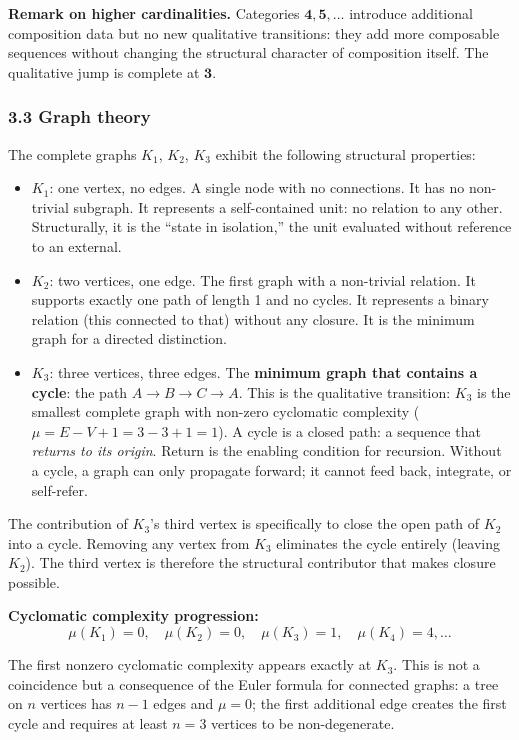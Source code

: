 \documentclass[
  11pt,
  letterpaper,
]{article}
\begin{document}
\textbf{Remark on higher cardinalities.} Categories
\(\mathbf{4}, \mathbf{5}, \ldots\) introduce additional composition data
but no new qualitative transitions: they add more composable sequences
without changing the structural character of composition itself. The
qualitative jump is complete at \(\mathbf{3}\).

\subsubsection{3.3 Graph theory}\label{graph-theory}

The complete graphs \(K_1\), \(K_2\), \(K_3\) exhibit the following
structural properties:

\begin{itemize}
\item
  \(K_1\): one vertex, no edges. A single node with no connections. It
  has no non-trivial subgraph. It represents a self-contained unit: no
  relation to any other. Structurally, it is the ``state in isolation,''
  the unit evaluated without reference to an external.
\item
  \(K_2\): two vertices, one edge. The first graph with a non-trivial
  relation. It supports exactly one path of length 1 and no cycles. It
  represents a binary relation (this connected to that) without any
  closure. It is the minimum graph for a directed distinction.
\item
  \(K_3\): three vertices, three edges. The \textbf{minimum graph that
  contains a cycle}: the path \(A \to B \to C \to A\). This is the
  qualitative transition: \(K_3\) is the smallest complete graph with
  non-zero cyclomatic complexity (\(\mu = E - V + 1 = 3 - 3 + 1 = 1\)).
  A cycle is a closed path: a sequence that \emph{returns to its
  origin}. Return is the enabling condition for recursion. Without a
  cycle, a graph can only propagate forward; it cannot feed back,
  integrate, or self-refer.
\end{itemize}

The contribution of \(K_3\)'s third vertex is specifically to close the
open path of \(K_2\) into a cycle. Removing any vertex from \(K_3\)
eliminates the cycle entirely (leaving \(K_2\)). The third vertex is
therefore the structural contributor that makes closure possible.

\textbf{Cyclomatic complexity progression:}
\[\mu(K_1) = 0, \quad \mu(K_2) = 0, \quad \mu(K_3) = 1, \quad \mu(K_4) = 4, \ldots\]

The first nonzero cyclomatic complexity appears exactly at \(K_3\). This
is not a coincidence but a consequence of the Euler formula for
connected graphs: a tree on \(n\) vertices has \(n-1\) edges and
\(\mu = 0\); the first additional edge creates the first cycle and
requires at least \(n = 3\) vertices to be non-degenerate.
\end{document}
